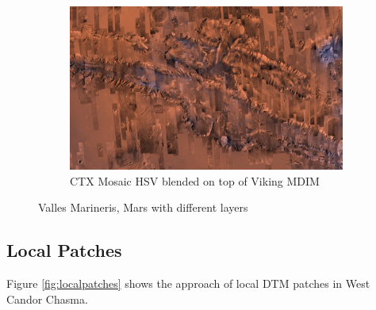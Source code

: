 \begin{figure}[h]
    \par\bigskip
    \begin{subfigure}[bt]{0.90\textwidth}
        \includegraphics[width=\textwidth]{figures/results/screenshots_thesis_old/valles_marineris3.jpg}
        \caption{CTX Mosaic HSV blended on top of Viking MDIM \cite{viking}}
    \end{subfigure}
    \caption{Valles Marineris, Mars with different layers}
    \label{fig:hsvblending}
\end{figure}

\clearpage
\subsection{Local Patches}
\label{section:localpatchesresult}
\FloatBarrier

Figure \ref{fig:localpatches} shows the approach of local DTM patches in West Candor Chasma.  

